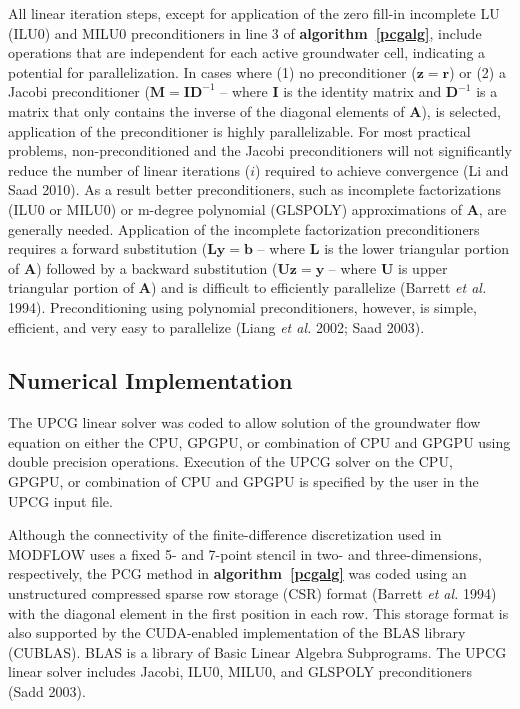 \documentclass[12pt]{article}
\begin{document}
All linear iteration steps, except for application of the zero fill-in incomplete LU (ILU0) and MILU0 preconditioners in line 3 of \textbf{algorithm~\ref{pcgalg}}, include operations that are independent for each active groundwater cell, indicating a potential for parallelization. In cases where (1) no preconditioner ($\mathbf{z = r}$) or (2) a Jacobi preconditioner ($\mathbf{M = I D}^{-1}$ -- where $\mathbf{I}$ is the identity matrix and $\mathbf{D}^{-1}$ is a matrix that only contains the inverse of the diagonal elements of $\mathbf{A}$), is selected, application of the preconditioner is highly parallelizable. For most practical problems, non-preconditioned and the Jacobi preconditioners will not significantly reduce the number of linear iterations ($i$) required to achieve convergence (Li and Saad 2010). As a result better preconditioners, such as incomplete factorizations (ILU0 or MILU0) or m-degree polynomial (GLSPOLY) approximations of $\mathbf{A}$, are generally needed. Application of the incomplete factorization preconditioners requires a forward substitution ($\mathbf{Ly = b}$ -- where $\mathbf{L}$ is the lower triangular portion of $\mathbf{A}$) followed by a backward substitution ($\mathbf{Uz = y}$ – where $\mathbf{U}$ is upper triangular portion of $\mathbf{A}$) and is difficult to efficiently parallelize (Barrett \textit{et al.} 1994). Preconditioning using polynomial preconditioners, however, is simple, efficient, and very easy to parallelize (Liang \textit{et al.} 2002; Saad 2003).

\subsection*{Numerical Implementation}
The UPCG linear solver was coded to allow solution of the groundwater flow equation on either the CPU, GPGPU, or combination of CPU and GPGPU using double precision operations. Execution of the UPCG solver on the CPU, GPGPU, or combination of CPU and GPGPU is specified by the user in the UPCG input file.

Although the connectivity of the finite-difference discretization used in MODFLOW uses a fixed 5- and 7-point stencil in two- and three-dimensions, respectively, the PCG method in \textbf{algorithm~\ref{pcgalg}} was coded using an unstructured compressed sparse row storage (CSR) format  (Barrett \textit{et al.} 1994) with the diagonal element in the first position in each row. This storage format is also supported by the \color{blue}CUDA-enabled implementation of the BLAS library (CUBLAS). BLAS is a library of Basic Linear Algebra Subprograms\color{black}. The UPCG linear solver includes Jacobi, ILU0, MILU0, and GLSPOLY preconditioners (Sadd 2003).
\end{document}
